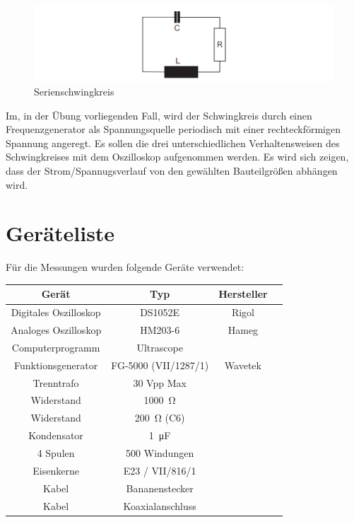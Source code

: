 \documentclass[11pt,ngerman]{scrartcl}
\begin{document}
\begin{figure}[H]
	\begin{center}
		\includegraphics[width=\textwidth]{abb6}
	\end{center}
	\caption{Serienschwingkreis}
	\label{fig:abb6}
\end{figure}

Im, in der Übung vorliegenden Fall, wird der Schwingkreis durch einen Frequenzgenerator als
Spannungsquelle periodisch mit einer rechteckförmigen Spannung angeregt. Es sollen die drei
unterschiedlichen Verhaltensweisen des Schwingkreises mit dem Oszilloskop aufgenommen werden.
Es wird sich zeigen, dass der Strom/Spannugsverlauf von den gewählten Bauteilgrößen
abhängen wird.



\section{Geräteliste}

\noindent Für die Messungen wurden folgende Geräte verwendet:

\begin{center}
	\begin{tabular}{|c|c|c|c|} \hline
		\textbf{Gerät}        & \textbf{Typ}         & \textbf{Hersteller} \\ \hline
		Digitales Oszilloskop & DS1052E              & Rigol               \\ \hline
		Analoges Oszilloskop  & HM203-6              & Hameg               \\ \hline
		Computerprogramm      & Ultrascope           &                     \\ \hline
		Funktionsgenerator    & FG-5000 (VII/1287/1) & Wavetek             \\ \hline
		Trenntrafo            & 30 Vpp Max           &                     \\ \hline
		Widerstand            & \SI{1000}{\ohm}      &                     \\ \hline
		Widerstand            & \SI{200}{\ohm} (C6)  &                     \\ \hline
		Kondensator           & \SI{1}{\micro\farad} &                     \\ \hline
		4 Spulen              & 500 Windungen        &                     \\ \hline
		Eisenkerne            & E23 / VII/816/1      &                     \\ \hline
		Kabel                 & Bananenstecker       &                     \\ \hline
		Kabel                 & Koaxialanschluss     &                     \\ \hline
	\end{tabular}
\end{center}
\end{document}
